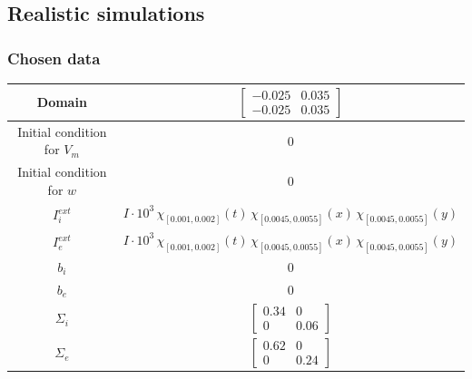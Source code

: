 \documentclass[9pt]{beamer}
\begin{document}
\begin{frame}
\section{Realistic simulations}
\frametitle{Chosen data}
\begin{center}
	\begin{tabular}{|c|c|} 
		\hline 
		Domain & $\begin{bmatrix} -0.025 & 0.035 \\ -0.025 & 0.035\end{bmatrix}$ \\
		\hline
		Initial condition for $V_m$ & 0 \\
		\hline
		Initial condition for $w$ & 0 \\
		\hline
		$I_i^{ext}$ & $I \cdot 10^3 \, \chi_{[0.001,0.002]}(t) \, \chi_{[0.0045,0.0055]}(x) \, \chi_{[0.0045,0.0055]}(y)$ \\
		\hline
		$I_e^{ext}$ & $I \cdot 10^3 \, \chi_{[0.001,0.002]}(t) \, \chi_{[0.0045,0.0055]}(x) \, \chi_{[0.0045,0.0055]}(y)$ \\
		\hline
		$b_i$ & 0 \\
		\hline
		$b_e$ & 0 \\
		\hline
		$\Sigma_i$ & $\begin{bmatrix} 0.34 & 0 \\ 0 & 0.06\end{bmatrix}$ \\
		\hline
		$\Sigma_e$ & $\begin{bmatrix} 0.62 & 0 \\ 0 & 0.24 \end{bmatrix}$ \\
		\hline 
	\end{tabular}
\end{center}
\end{frame}
\end{document}

